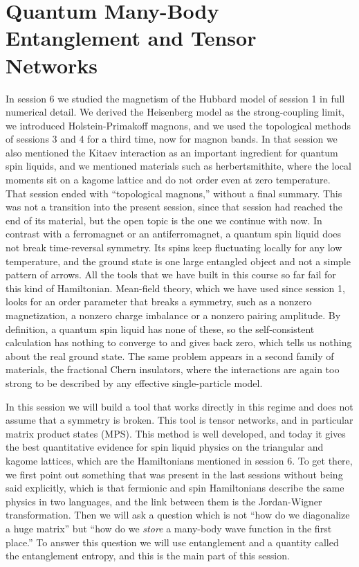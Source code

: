 \chapter{Quantum Many-Body Entanglement and Tensor Networks}

In session 6 we studied the magnetism of the Hubbard model of session 1 in full numerical detail. We
derived the Heisenberg model as the strong-coupling limit, we introduced Holstein-Primakoff magnons,
and we used the topological methods of sessions 3 and 4 for a third time, now for magnon bands. In
that session we also mentioned the Kitaev interaction as an important ingredient for quantum spin
liquids, and we mentioned materials such as herbertsmithite, where the local moments sit on a kagome
lattice and do not order even at zero temperature. That session ended with ``topological magnons,''
without a final summary. This was not a transition into the present session, since that session had
reached the end of its material, but the open topic is the one we continue with now. In contrast with a ferromagnet or an antiferromagnet, a quantum spin liquid does not
break time-reversal symmetry. Its spins keep fluctuating locally for any low temperature, and the
ground state is one large entangled object and not a simple pattern of arrows. All the tools that we
have built in this course so far fail for this kind of Hamiltonian. Mean-field theory, which we have
used since session 1, looks for an order parameter that breaks a symmetry, such as a nonzero
magnetization, a nonzero charge imbalance or a nonzero pairing amplitude. By definition, a quantum
spin liquid has none of these, so the self-consistent calculation has nothing to converge to and
gives back zero, which tells us nothing about the real ground state. The same problem appears in a
second family of materials, the fractional Chern insulators, where the interactions are again too
strong to be described by any effective single-particle model.

In this session we will build a tool that works directly in this regime and does not assume that a
symmetry is broken. This tool is tensor networks, and in particular matrix product states (MPS). This
method is well developed, and today it gives the best quantitative evidence for spin liquid physics on
the triangular and kagome lattices, which are the Hamiltonians mentioned in session 6. To get there,
we first point out something that was present in the last sessions without being said explicitly,
which is that fermionic and spin Hamiltonians describe the same physics in two languages, and the
link between them is the Jordan-Wigner transformation. Then we will ask a question which is not
``how do we diagonalize a huge matrix'' but ``how do we \emph{store} a many-body wave function in
the first place.'' To answer this question we will use entanglement and a quantity called the
entanglement entropy, and this is the main part of this session.

